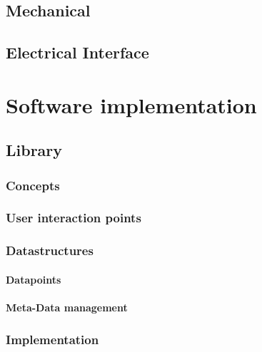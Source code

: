 \hypertarget{mechanical}{%
\section{Mechanical}\label{mechanical}}

\hypertarget{electrical-interface}{%
\section{Electrical Interface}\label{electrical-interface}}

\hypertarget{software-implementation}{%
\chapter{Software implementation}\label{software-implementation}}

\hypertarget{library}{%
\section{Library}\label{library}}

\hypertarget{concepts}{%
\subsection{Concepts}\label{concepts}}

\hypertarget{user-interaction-points}{%
\subsection{User interaction points}\label{user-interaction-points}}

\hypertarget{datastructures}{%
\subsection{Datastructures}\label{datastructures}}

\hypertarget{datapoints}{%
\subsubsection{Datapoints}\label{datapoints}}

\hypertarget{meta-data-management}{%
\subsubsection{Meta-Data management}\label{meta-data-management}}

\hypertarget{implementation}{%
\subsection{Implementation}\label{implementation}}

